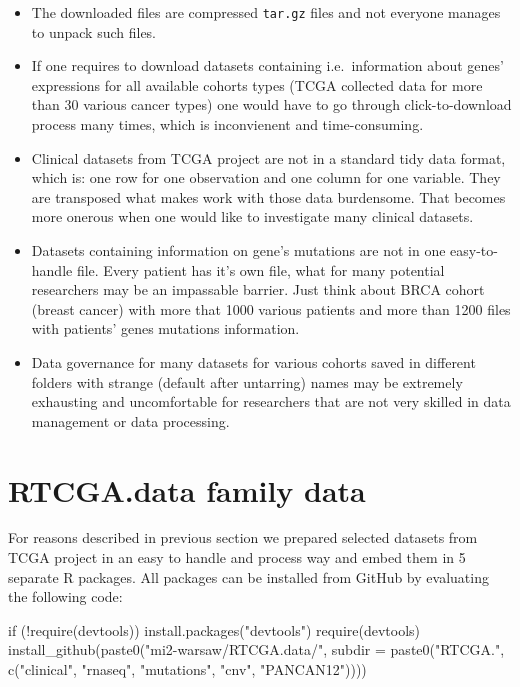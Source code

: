 \begin{itemize}
\itemsep1pt\parskip0pt
\item
  The downloaded files are compressed \texttt{tar.gz} files and not
  everyone manages to unpack such files.
\item
  If one requires to download datasets containing i.e.~information about
  genes' expressions for all available cohorts types (TCGA collected
  data for more than 30 various cancer types) one would have to go
  through click-to-download process many times, which is inconvienent
  and time-consuming.
\item
  Clinical datasets from TCGA project are not in a standard tidy data
  format, which is: one row for one observation and one column for one
  variable. They are transposed what makes work with those data
  burdensome. That becomes more onerous when one would like to
  investigate many clinical datasets.
\item
  Datasets containing information on gene's mutations are not in one
  easy-to-handle file. Every patient has it's own file, what for many
  potential researchers may be an impassable barrier. Just think about
  BRCA cohort (breast cancer) with more that 1000 various patients and
  more than 1200 files with patients' genes mutations information.
\item
  Data governance for many datasets for various cohorts saved in
  different folders with strange (default after untarring) names may be
  extremely exhausting and uncomfortable for researchers that are not
  very skilled in data management or data processing.
\end{itemize}

\section{RTCGA.data family data}\label{rtcga.data-family-data}

For reasons described in previous section we prepared selected datasets
from TCGA project in an easy to handle and process way and embed them in
5 separate R packages. All packages can be installed from GitHub by
evaluating the following code:

\begin{Schunk}
\begin{Sinput}
if (!require(devtools)) {
    install.packages("devtools")
    require(devtools)
}
install_github(paste0("mi2-warsaw/RTCGA.data/", 
                  subdir = paste0("RTCGA.", 
   c("clinical", "rnaseq", "mutations", "cnv", "PANCAN12"))))
\end{Sinput}
\end{Schunk}


